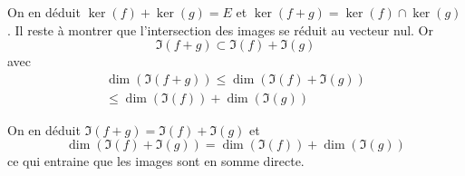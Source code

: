 On en déduit $\ker(f) + \ker(g) = E$ et $\ker(f+g) = \ker(f) \cap \ker(g)$. \newline
Il reste à montrer que l'intersection des images se réduit au vecteur nul. Or
\begin{displaymath}
  \Im(f+g) \subset \Im(f) + \Im(g)
\end{displaymath}
avec
\begin{multline*}
  \dim(\Im(f+g)) \leq \dim(\Im(f) + \Im(g)) \\
  \leq \dim(\Im(f)) + \dim(\Im(g))
\end{multline*}

On en déduit $\Im(f+g) = \Im(f) + \Im(g)$ et 
\begin{displaymath}
\dim(\Im(f) + \Im(g))
=\dim(\Im(f)) + \dim(\Im(g))
\end{displaymath}
ce qui entraine que les images sont en somme directe.
